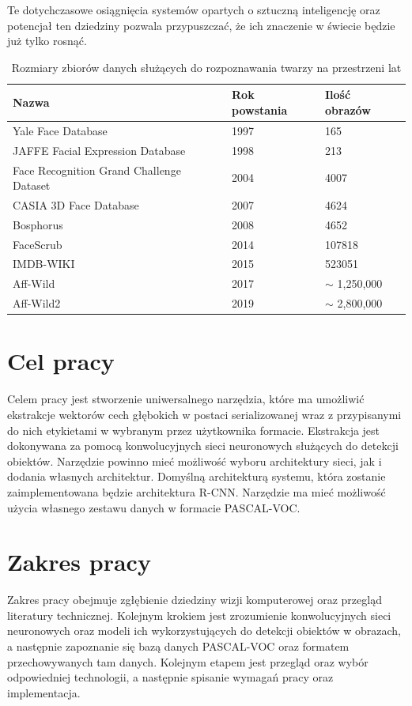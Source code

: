 \documentclass[a4paper,twoside,12pt]{book}
\begin{document}
{Te dotychczasowe osiągnięcia systemów opartych o sztuczną inteligencję oraz potencjał ten dziedziny pozwala przypuszczać, że ich znaczenie w świecie będzie już tylko rosnąć. }
 





\begin{table}
\centering

\begin{tabular}{|l|l|l|}
\hline
Nazwa & Rok powstania & Ilość obrazów \\
\hline
Yale Face Database\cite{Yale} & 1997 & 165 \\
JAFFE Facial Expression Database\cite{lyons1998coding}  & 1998 &  213 \\
Face Recognition Grand Challenge Dataset\cite{bowyer2006survey} & 2004 & 4007 \\
CASIA 3D Face Database\cite{Cas} & 2007 & 4624 \\
Bosphorus\cite{savran2008bosphorus} &2008& 4652 \\
FaceScrub\cite{ng2014data} & 2014 & 107818 \\
IMDB-WIKI\cite{Rothe-ICCVW-2015} & 2015 & 523051 \\
Aff-Wild \cite{zafeiriou2017aff} & 2017 & $\sim$ 1,250,000 \\
Aff-Wild2 \cite{kollias2019expression} & 2019 &$\sim$ 2,800,000 \\
\end{tabular}
\caption{Rozmiary zbiorów danych służących do rozpoznawania twarzy na przestrzeni lat}
\label{tab:datasets}
\end{table}  

\section{Cel pracy}
{Celem pracy jest stworzenie uniwersalnego narzędzia, które ma umożliwić ekstrakcje wektorów cech głębokich w postaci serializowanej wraz z przypisanymi do nich etykietami w wybranym przez użytkownika formacie. Ekstrakcja jest dokonywana za pomocą konwolucyjnych sieci neuronowych służących do detekcji obiektów. Narzędzie powinno mieć możliwość wyboru architektury sieci, jak i dodania własnych architektur. Domyślną architekturą systemu, która zostanie zaimplementowana będzie architektura R-CNN. Narzędzie ma mieć możliwość użycia własnego zestawu danych w formacie PASCAL-VOC.}
\section{Zakres pracy}
{Zakres pracy obejmuje zgłębienie dziedziny wizji komputerowej oraz przegląd literatury technicznej. Kolejnym krokiem jest zrozumienie konwolucyjnych sieci neuronowych oraz modeli ich wykorzystujących do detekcji obiektów w obrazach, a następnie zapoznanie się bazą danych PASCAL-VOC oraz formatem przechowywanych tam danych. Kolejnym etapem jest przegląd oraz wybór odpowiedniej technologii, a następnie spisanie wymagań pracy oraz implementacja. }
\end{document}
